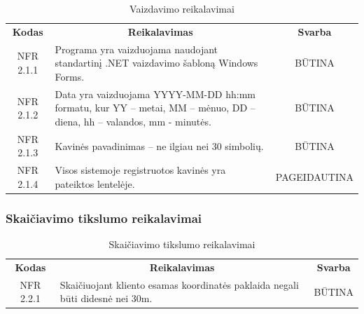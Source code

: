 \documentclass{VUMIFPSkursinis}
\begin{document}
\begin{center}
	\begin{table}[H]
	\caption{Vaizdavimo reikalavimai}
	\begin{tabular}{|p{2cm}|p{}|p{}|}
	\hline
	    \rowcolor{lightgray}
		\multicolumn{3}{|c|}{Vaizdavimo reikalavimai}\\
		
	\hline
		\multicolumn{1}{|c|}{{\bfseries Kodas}}&
		\multicolumn{1}{|c|}{{\bfseries Reikalavimas}}&
		\multicolumn{1}{|c|}{{\bfseries Svarba}}\\
	\hline 	
		\multicolumn{1}{|c|}{NFR 2.1.1}&
		{Programa yra vaizduojama naudojant standartinį .NET vaizdavimo šabloną Windows Forms.}&
		\multicolumn{1}{|c|}{BŪTINA}\\	
	
	\hline 	
		\multicolumn{1}{|c|}{NFR 2.1.2}&
		{Data yra vaizduojama YYYY-MM-DD hh:mm formatu, kur YY – metai, MM – mėnuo, DD – diena, hh – valandos, mm - minutės.}&
		\multicolumn{1}{|c|}{BŪTINA}\\	
	
	\hline 	
		\multicolumn{1}{|c|}{NFR 2.1.3}&
		{Kavinės pavadinimas – ne ilgiau nei 30 simbolių.}&
		\multicolumn{1}{|c|}{BŪTINA}\\	
	
	\hline  	
		\multicolumn{1}{|c|}{NFR 2.1.4}&
		{Visos sistemoje registruotos kavinės yra pateiktos lentelėje.}&
		\multicolumn{1}{|p{1.5cm}|}{PAGEIDAUTINA}\\		
	
	\hline 	 	 	
	\end{tabular}
	
	\label{table:Vaizdavimoreikalavimai}
	\end{table}

\end{center}

\subsubsection{Skaičiavimo tikslumo reikalavimai}

\begin{center}
	\begin{table}[H]
	\caption{Skaičiavimo tikslumo reikalavimai}
	\begin{tabular}{|p{2cm}|p{}|p{}|}
	\hline
	    \rowcolor{lightgray}
		\multicolumn{3}{|c|}{Skaičiavimo tikslumo reikalavimai}\\
		
	\hline
		\multicolumn{1}{|c|}{{\bfseries Kodas}}&
		\multicolumn{1}{|c|}{{\bfseries Reikalavimas}}&
		\multicolumn{1}{|c|}{{\bfseries Svarba}}\\
	\hline 	
		\multicolumn{1}{|c|}{NFR 2.2.1}&
		{Skaičiuojant kliento esamas koordinatės paklaida negali būti didesnė nei 30m.}&
		\multicolumn{1}{|c|}{BŪTINA}\\	
	\hline 	 	 	
	\end{tabular}
	
	\label{table:Skaičiavimotikslumoreikalavimai}
	\end{table}

\end{center}
\end{document}
